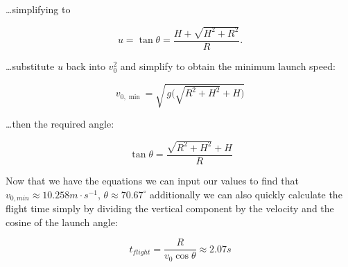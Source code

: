 \documentclass[a4paper,10pt]{article}
\begin{document}
\ldots simplifying to

\begin{equation}
u=\tan\theta
= \frac{H+\sqrt{H^{2}+R^{2}}}{R}.
\end{equation}

\ldots substitute \(u\) back into \(v_0^{2}\) and simplify to obtain the minimum launch speed:

\begin{equation}
\boxed{\,v_{0,\min}=\sqrt{\,g\big(\sqrt{R^{2}+H^{2}}+H\big)}\,}
\end{equation}

\ldots then the required angle:

\begin{equation}
\boxed{\,\tan\theta=\dfrac{\sqrt{R^{2}+H^{2}}+H}{R}}
\end{equation}

Now that we have the equations we can input our values to find that $v_{0,min} \approx 10.258 m\cdot s^{-1}$, $\theta \approx 70.67 ^\circ$ additionally we can also quickly calculate the flight time simply by dividing the vertical component by the velocity and the cosine of the launch angle:

\begin{equation}
    t_{flight} = \frac{R}{v_0 \cos\theta} \approx 2.07s
\end{equation}
\end{document}
